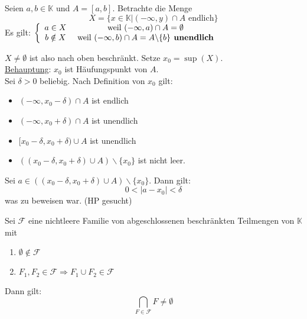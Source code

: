 \documentclass[main.tex]{subfiles}
\begin{document}
\begin{Beweis}
  Seien $a,b \in \mathbb{K}$ und $A = [a,b]$. Betrachte die Menge
  $$X = \{ x \in \mathbb{K} | (-\infty,y)\cap A \text{ endlich}\}$$
  Es gilt: $\left\{ \begin{array}{c c}
    a \in X & \text{ weil } (-\infty,a)\cap A= \emptyset\\
    b \notin X & \text{ weil }(-\infty,b)\cap A= A\backslash\{b\} \textbf{ unendlich}
  \end{array}\right.$

  $X\neq \emptyset$ ist also nach oben beschränkt. Setze $x_0 = \sup(X)$.\\
  \underline{Behauptung}: $x_0$ ist Häufungspunkt von $A$.\\
  Sei $\delta > 0$ beliebig. Nach Definition von $x_0$ gilt:
  \begin{itemize}
    \item $(-\infty,x_0 - \delta) \cap A$ ist endlich
    \item $(-\infty,x_0 + \delta) \cap A$ ist unendlich
    \item $[x_0-\delta,x_0+\delta) \cup A$ ist unendlich
    \item $((x_0-\delta,x_0+\delta)\cup A) \backslash \{x_0\}$ ist nicht leer.
  \end{itemize}
  Sei $a \in ((x_0-\delta,x_0+\delta)\cup A) \backslash \{x_0\}$. Dann gilt:
  $$0 < |a-x_0| < \delta$$
  was zu beweisen war. (HP gesucht)
\end{Beweis}

\begin{Theorem}[Schachtelungsprinzip]
  Sei $\mathcal{F}$ eine nichtleere Familie von abgeschlossenen beschränkten Teilmengen von $\mathbb{K}$ mit
  \begin{enumerate}
    \item $\emptyset \notin \mathcal{F}$
    \item $F_1,F_2 \in \mathcal{F} \Rightarrow F_1 \cup F_2 \in \mathcal{F}$
  \end{enumerate}
  Dann gilt:
  $$\bigcap_{F \in \mathcal{F}}F \neq \emptyset$$
\end{Theorem}
\end{document}
